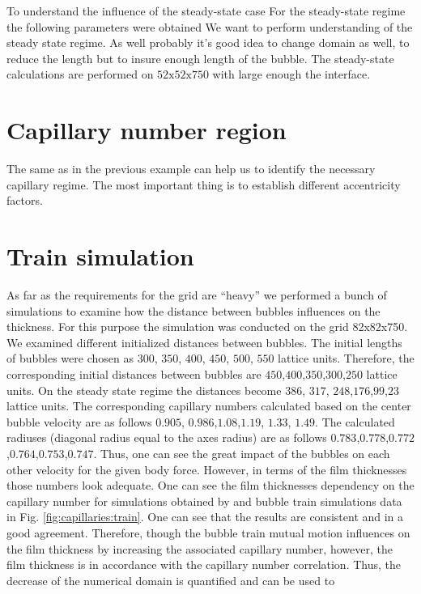 \documentclass{article}
\begin{document}
To understand the influence of the steady-state case
For the steady-state regime the following parameters were obtained
We want to perform understanding of the steady state regime. As well probably it's good idea to
change domain as well, to reduce the length but to insure enough length of the bubble. The
steady-state calculations are performed on $52\mathrm{x}52\mathrm{x}750$ with large enough the
interface. 

\section{Capillary number region}
The same as in the previous example can help us to identify the necessary capillary regime. The
most important thing is to establish different accentricity factors.

\section{Train simulation}
As far as the requirements for the grid are ``heavy'' we performed a bunch of simulations to
examine how the distance between bubbles influences on the thickness. For this purpose the
simulation was conducted on the grid 82x82x750. We examined different initialized distances between
bubbles. The initial lengths of bubbles were chosen as $300$, $350$, $400$, $450$, $500$, $550$
lattice units. Therefore, the corresponding initial distances between bubbles are
$450$,$400$,$350$,$300$,$250$ lattice units. On the steady state regime the distances become $386$,
$317$, $248$,$176$,$99$,$23$ lattice units. The corresponding capillary numbers calculated based on
the center bubble velocity are as follows $0.905$, $0.986$,$1.08$,$1.19$, $1.33$, $1.49$. The
calculated radiuses (diagonal radius equal to the axes radius) are as follows
$0.783$,$0.778$,$0.772$,$0.764$,$0.753$,$0.747$. Thus, one can see the great impact of the bubbles
on each other velocity for the given body force. However, in terms of the film thicknesses those
numbers look adequate. One can see the film thicknesses dependency on the capillary number for
simulations obtained by \citet{heil-threedim} and bubble train simulations data in Fig.
\ref{fig:capillaries:train}. One can see that the results are consistent and in a good agreement.
Therefore, though the bubble train mutual motion influences on the film thickness by increasing the
associated capillary number,  however, the film thickness is in accordance with the capillary
number correlation. Thus, the decrease of the numerical domain is quantified and can be used to
\end{document}
